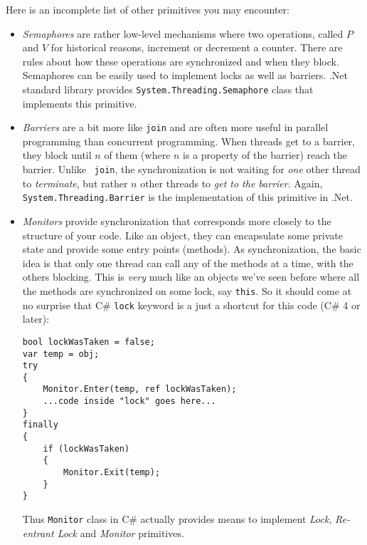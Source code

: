 \documentclass[10pt]{article}
\begin{document}
Here is an incomplete list of other primitives you may encounter:
\begin{itemize}
\item \emph{Semaphores} are rather low-level mechanisms where two
  operations, called $P$ and $V$ for historical reasons, increment or
  decrement a counter.  There are rules about how these operations are
  synchronized and when they block.  Semaphores can be easily used to
  implement locks as well as barriers. .Net standard library provides
  {\tt System.Threading.Semaphore} class that implements this primitive.
\item \emph{Barriers} are a bit more like {\tt join} and are often
  more useful in parallel programming than concurrent programming.
  When threads get to a barrier, they block until $n$ of them (where
  $n$ is a property of the barrier) reach the barrier.  Unlike {\tt
  join}, the synchronization is not waiting for \emph{one} other
  thread to \emph{terminate}, but rather $n$ other threads to
  \emph{get to the barrier}. Again, {\tt System.Threading.Barrier} 
  is the implementation of this primitive in .Net.
\item \emph{Monitors} provide synchronization that corresponds more
  closely to the structure of your code.  Like an object, they can
  encapsulate some private state and provide some entry points
  (methods).  As synchronization, the basic idea is that only one
  thread can call any of the methods at a time, with the others
  blocking.  This is \emph{very} much like an objects we've seen before 
  where all the methods are synchronized on some lock, say {\tt this}.
  So it should come at no surprise that C\# {\tt lock} keyword is a just 
  a shortcut for this code (C\# 4 or later):
\begin{verbatim}
bool lockWasTaken = false;
var temp = obj;
try
{
    Monitor.Enter(temp, ref lockWasTaken);
    ...code inside "lock" goes here...
}
finally
{
    if (lockWasTaken)
    {
        Monitor.Exit(temp);
    }
}
\end{verbatim}
  Thus {\tt Monitor} class in C\# actually provides means to implement
  \emph{Lock}, \emph{Re-entrant Lock} and \emph{Monitor} primitives. 
\end{itemize}
\end{document}

